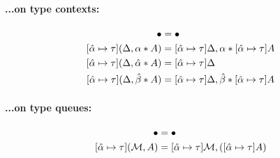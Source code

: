 \documentclass{article}
\newcommand{\mypar}[1]{\vspace{0.2cm}\paragraph{#1:} \hfill\vspace{0.1cm}}
\begin{document}
\noindent
\begin{minipage}[t]{0.47\textwidth}
  \mypar{{...on type contexts}}
  \begin{align*}
    [\unification{\alpha}{\tau}]\bullet &= \bullet\\
    [\unification{\alpha}{\tau}](\Delta,\tentry{\alpha}{A}) &= [\unification{\alpha}{\tau}]\Delta,\tentry{\alpha}{[\unification{\alpha}{\tau}]A}\\
    [\unification{\alpha}{\tau}](\Delta,\tentry{\hat\alpha}{A}) &= [\unification{\alpha}{\tau}]\Delta\\
    [\unification{\alpha}{\tau}](\Delta,\tentry{\hat\beta}{A}) &= [\unification{\alpha}{\tau}]\Delta,\tentry{\hat\beta}{[\unification{\alpha}{\tau}]A}\\
  \end{align*}
\end{minipage}
\begin{minipage}[t]{0.47\textwidth}
    \mypar{{...on type queues}}
  \begin{align*}
    [\unification{\alpha}{\tau}]\bullet &= \bullet\\
    [\unification{\alpha}{\tau}](\mathcal{M},A) &= [\unification{\alpha}{\tau}]\mathcal{M},([\unification{\alpha}{\tau}]A)\\
  \end{align*}
\end{minipage}\vspace{3pt}
\end{document}
